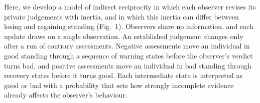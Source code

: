 Here, we develop a model of indirect reciprocity in which each observer revises its private judgements with inertia, and in which this inertia can differ between losing and regaining standing (Fig.~1). Observers share no information, and each update draws on a single observation. An established judgement changes only after a run of contrary assessments. Negative assessments move an individual in good standing through a sequence of warning states before the observer's verdict turns bad, and positive assessments move an individual in bad standing through recovery states before it turns good. Each intermediate state is interpreted as good or bad with a probability that sets how strongly incomplete evidence already affects the observer's behaviour.
